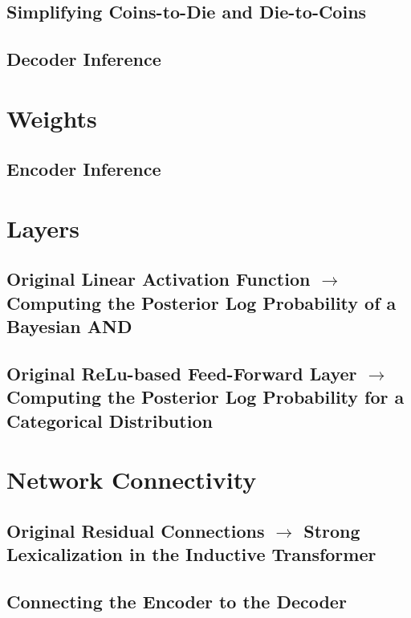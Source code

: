 \subsection{Simplifying Coins-to-Die and Die-to-Coins}

\subsection{Decoder Inference}

\section{Weights}

\subsection{Encoder Inference}

\section{Layers}

\subsection{Original Linear Activation Function $\rightarrow$ Computing the Posterior Log Probability of a Bayesian AND}

\subsection{Original ReLu-based Feed-Forward Layer $\rightarrow$ Computing the Posterior Log Probability for a Categorical Distribution}

\section{Network Connectivity}

\subsection{Original Residual Connections $\rightarrow$ Strong Lexicalization in the Inductive Transformer}

\subsection{Connecting the Encoder to the Decoder}

